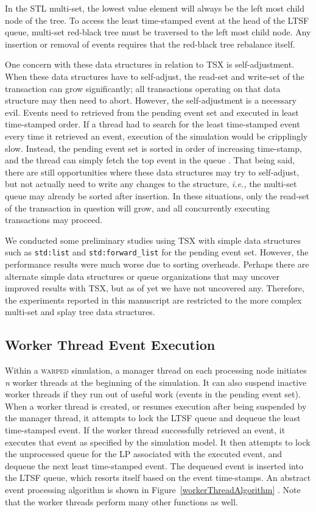 \documentclass{sig-alternate}
\begin{document}
In the STL multi-set, the lowest value element will always be the left most child node of
the tree.  To access the least time-stamped event at the head of the LTSF queue, multi-set
red-black tree must be traversed to the left most child node.  Any insertion or removal of
events requires that the red-black tree rebalance itself.

One concern with these data structures in relation to TSX is self-adjustment.  When these
data structures have to self-adjust, the read-set and write-set of the transaction can
grow significantly; all transactions operating on that data structure may then need to
abort.  However, the self-adjustment is a necessary evil.  Events need to retrieved from
the pending event set and executed in least time-stamped order.  If a thread had to search
for the least time-stamped event every time it retrieved an event, execution of the
simulation would be cripplingly slow.  Instead, the pending event set is sorted in order
of increasing time-stamp, and the thread can simply fetch the top event in the queue
\cite{muthalagu}.  That being said, there are still opportunities where these data
structures may try to self-adjust, but not actually need to write any changes to the
structure, \emph{i.e.,} the multi-set queue may already be sorted after insertion.  In
these situations, only the read-set of the transaction in question will grow, and all
concurrently executing transactions may proceed.

We conducted some preliminary studies using TSX with simple data structures such as
\texttt{std:list} and \texttt{std:forward\_list} for the pending event set.  However, the
performance results were much worse due to sorting overheads.  Perhaps there are alternate
simple data structures or queue organizations that may uncover improved results with TSX,
but as of yet we have not uncovered any. Therefore, the experiments reported in this
manuscript are restricted to the more complex multi-set and splay tree data structures.

\subsection{Worker Thread Event Execution}

Within a \textsc{warped} simulation, a manager thread on each processing node initiates
\emph{n} worker threads at the beginning of the simulation.  It can also suspend inactive
worker threads if they run out of useful work (events in the pending event set).  When a
worker thread is created, or resumes execution after being suspended by the manager
thread, it attempts to lock the LTSF queue and dequeue the least time-stamped event.  If
the worker thread successfully retrieved an event, it executes that event as specified by
the simulation model.  It then attempts to lock the unprocessed queue for the LP
associated with the executed event, and dequeue the next least time-stamped event.  The
dequeued event is inserted into the LTSF queue, which resorts itself based on the event
time-stamps.  An abstract event processing algorithm is shown in
Figure~\ref{workerThreadAlgorithm} \cite{dickman}.  Note that the worker threads perform
many other functions as well.
\end{document}
